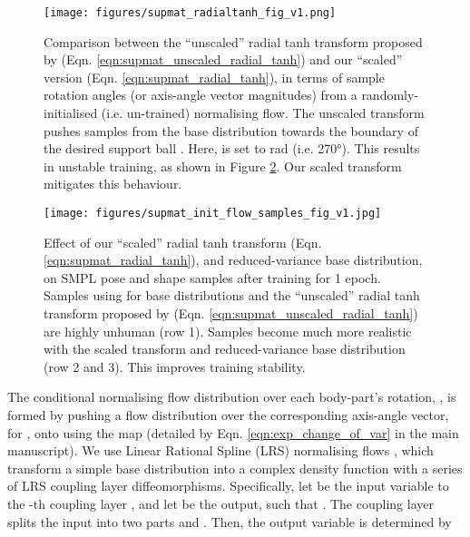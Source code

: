 \begin{figure}[t]
    \centering
    \texttt{[image: figures/supmat\_radialtanh\_fig\_v1.png]}
    \caption{Comparison between the ``unscaled'' radial tanh transform proposed by \cite{falorsi2019reparameterizing} (Eqn. \ref{eqn:supmat_unscaled_radial_tanh}) and our ``scaled'' version (Eqn. \ref{eqn:supmat_radial_tanh}), in terms of sample rotation angles (or axis-angle vector magnitudes) from a randomly-initialised (i.e. un-trained) normalising flow. The unscaled transform pushes samples from the base distribution  towards the boundary of the desired support ball . Here,  is set to  rad (i.e. 270°). This results in unstable training, as shown in Figure \ref{fig:supmat_init_flow_samples_fig}. Our scaled transform mitigates this behaviour.}
    \vspace{-0.3cm}
    \label{fig:supmat_radialtanh_fig}
\end{figure}

\begin{figure}[t]
    \centering
    \texttt{[image: figures/supmat\_init\_flow\_samples\_fig\_v1.jpg]}
    \caption{Effect of our ``scaled'' radial tanh transform (Eqn. \ref{eqn:supmat_radial_tanh}), and reduced-variance base distribution, on SMPL pose and shape samples after training for 1 epoch. Samples using  for base distributions and the ``unscaled'' radial tanh transform proposed by \cite{falorsi2019reparameterizing} (Eqn. \ref{eqn:supmat_unscaled_radial_tanh}) are highly unhuman (row 1). Samples become much more realistic with the scaled transform and reduced-variance base distribution (row 2 and 3). This improves training stability.}
    \vspace{-0.5cm}
    \label{fig:supmat_init_flow_samples_fig}
\end{figure}

The conditional normalising flow distribution over each body-part's rotation,  , is formed by pushing a flow distribution over the corresponding axis-angle vector,  for , onto  using the  map (detailed by Eqn. \ref{eqn:exp_change_of_var} in the main manuscript). We use Linear Rational Spline (LRS) normalising flows \cite{dolatabadi2020lrs}, which transform a simple base distribution into a complex density function with a series of LRS coupling layer diffeomorphisms.  Specifically, let  be the input variable to the -th coupling layer , and let  be the output, such that . The coupling layer \cite{dinh2015nice, dinh2017realnvp} splits the input into two parts  and . Then, the output variable is determined by

